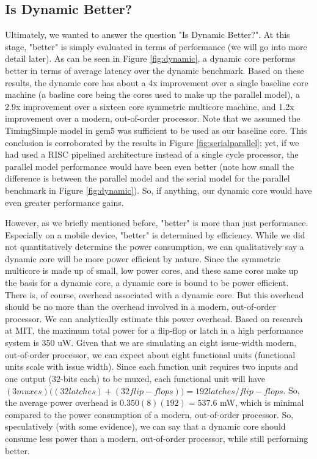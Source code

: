 \subsection{Is Dynamic Better?}
Ultimately, we wanted to answer the question "Is Dynamic Better?". At this stage, "better" is simply evaluated in terms of performance (we will go into more detail later). As can be seen in Figure \ref{fig:dynamic}, a dynamic core performs better in terms of average latency over the dynamic benchmark. Based on these results, the dynamic core has about a 4x improvement over a single baseline core machine (a basline core being the cores used to make up the parallel model), a 2.9x improvement over a sixteen core symmetric multicore machine, and 1.2x improvement over a modern, out-of-order processor. Note that we assumed the TimingSimple model in gem5 was sufficient to be used as our baseline core. This conclusion is corroborated by the results in Figure \ref{fig:serialparallel}; yet, if we had used a RISC pipelined architecture instead of a single cycle processor, the parallel model performance would have been even better (note how small the difference is between the parallel model and the serial model for the parallel benchmark in Figure \ref{fig:dynamic}). So, if anything, our dynamic core would have even greater performance gains.

However, as we briefly mentioned before, "better" is more than just performance. Especially on a mobile device, "better" is determined by efficiency. While we did not quantitatively determine the power consumption, we can qualitatively say a dynamic core will be more power efficient by nature. Since the symmetric multicore is made up of small, low power cores, and these same cores make up the basis for a dynamic core, a dynamic core is bound to be power efficient. There is, of course, overhead associated with a dynamic core. But this overhead should be no more than the overhead involved in a modern, out-of-order processor. We can analytically estimate this power overhead. Based on research at MIT, the maximum total power for a flip-flop or latch in a high performance system is 350 uW. Given that we are simulating an eight issue-width modern, out-of-order processor, we can expect about eight functional units (functional units scale with issue width). Since each function unit requires two inputs and one output (32-bits each) to be muxed, each functional unit will have $(3 muxes) \dot ((32 latches) + (32 flip-flops)) = 192 latches/flip-flops$. So, the average power overhead is $0.350(8)(192) = 537.6$ mW, which is minimal compared to the power consumption of a modern, out-of-order processor. So, speculatively (with some evidence), we can say that a dynamic core should consume less power than a modern, out-of-order processor, while still performing better.

